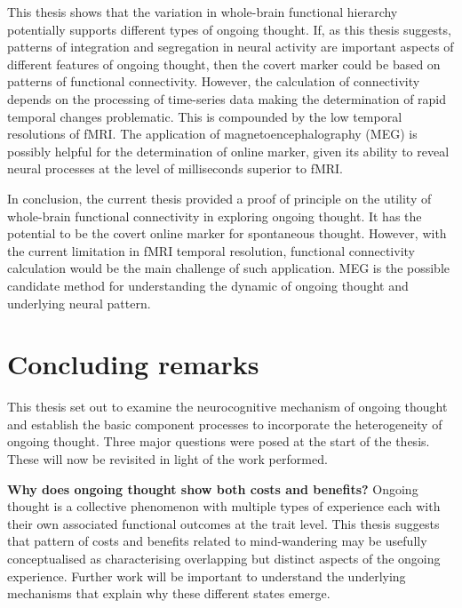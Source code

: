 This thesis shows that the variation in whole-brain functional hierarchy potentially supports different types of ongoing thought. If, as this thesis suggests, patterns of integration and segregation in neural activity are important aspects of different features of ongoing thought, then the covert marker could be based on patterns of functional connectivity. However, the calculation of connectivity depends on the processing of time-series data making the determination of rapid temporal changes problematic. This is compounded by the low temporal resolutions of fMRI. The application of magnetoencephalography (MEG) is possibly helpful for the determination of online marker, given its ability to reveal neural processes at the level of milliseconds superior to fMRI.

In conclusion, the current thesis provided a proof of principle on the utility of whole-brain functional connectivity in exploring ongoing thought. It has the potential to be the covert online marker for spontaneous thought. However, with the current limitation in fMRI temporal resolution, functional connectivity calculation would be the main challenge of such application. MEG is the possible candidate method for understanding the dynamic of ongoing thought and underlying neural pattern.



\section{Concluding remarks}
\label{ch:discussion:summary}

This thesis set out to examine the neurocognitive mechanism of ongoing thought and establish the basic component processes to incorporate the heterogeneity of ongoing thought. Three major questions were posed at the start of the thesis. These will now be revisited in light of the work performed.

\textbf{Why does ongoing thought show both costs and benefits?} Ongoing thought is a collective phenomenon with multiple types of experience each with their own associated functional outcomes at the trait level. This thesis suggests that pattern of costs and benefits related to mind-wandering may be usefully conceptualised as characterising overlapping but distinct aspects of the ongoing experience. Further work will be important to understand the underlying mechanisms that explain why these different states emerge.

